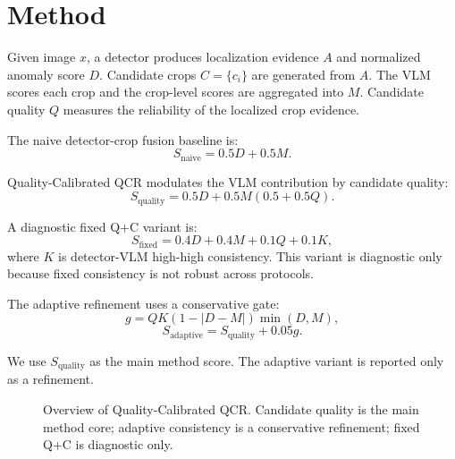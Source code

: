 \documentclass[10pt]{article}
\begin{document}
\section{Method}

Given image $x$, a detector produces localization evidence $A$ and normalized anomaly score $D$.
Candidate crops $C=\{c_i\}$ are generated from $A$.
The VLM scores each crop and the crop-level scores are aggregated into $M$.
Candidate quality $Q$ measures the reliability of the localized crop evidence.

The naive detector-crop fusion baseline is:
\begin{equation}
S_{\mathrm{naive}} = 0.5D + 0.5M.
\end{equation}

Quality-Calibrated QCR modulates the VLM contribution by candidate quality:
\begin{equation}
S_{\mathrm{quality}} = 0.5D + 0.5M(0.5 + 0.5Q).
\end{equation}

A diagnostic fixed Q+C variant is:
\begin{equation}
S_{\mathrm{fixed}} = 0.4D + 0.4M + 0.1Q + 0.1K,
\end{equation}
where $K$ is detector-VLM high-high consistency.
This variant is diagnostic only because fixed consistency is not robust across protocols.

The adaptive refinement uses a conservative gate:
\begin{equation}
g = QK(1-|D-M|)\min(D,M),
\end{equation}
\begin{equation}
S_{\mathrm{adaptive}} = S_{\mathrm{quality}} + 0.05g.
\end{equation}

We use $S_{\mathrm{quality}}$ as the main method score.
The adaptive variant is reported only as a refinement.

\begin{figure}[t]
\centering
{}
\caption{Overview of Quality-Calibrated QCR. Candidate quality is the main method core; adaptive consistency is a conservative refinement; fixed Q+C is diagnostic only.}
\label{fig:framework}
\end{figure}
\end{document}
